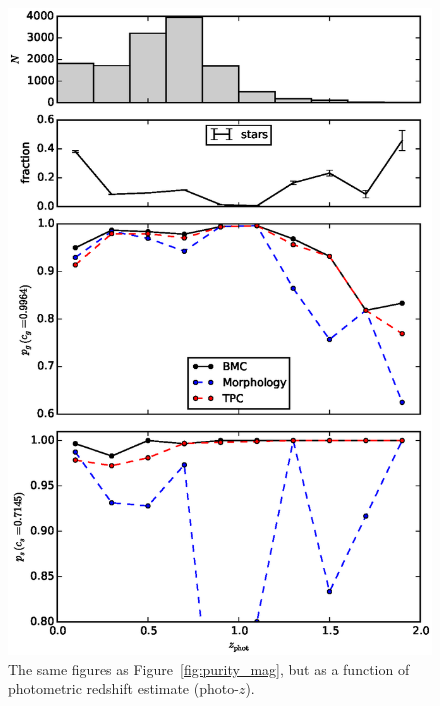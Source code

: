 \documentclass[useAMS,usenatbib]{mn2e}
\begin{document}
\begin{figure}
  \centering
  \includegraphics[width=\linewidth]{figures/purity_z.eps}
  \caption{The same figures as Figure~\ref{fig:purity_mag},
           but as a function of photometric redshift estimate
           (photo-$z$).}
  \label{fig:purity_z}
\end{figure}
\end{document}
